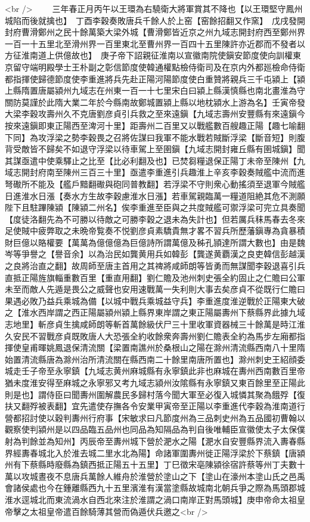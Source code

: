 <br />
　　三年春正月丙午以王環為右驍衛大將軍賞其不降也【以王環堅守鳳州城陷而後就擒也】　丁酉李穀奏敗唐兵千餘人於上窑【窑餘招翻又作窯】　戊戌發開封府曹滑鄭州之民十餘萬築大梁外城【曹滑鄭皆近京之州九域志開封府西至鄭州界一百一十五里北至滑州界一百里東北至曹州界一百四十五里陳許亦近郡而不發者以方征淮南道上供億故也】　庚子帝下詔親征淮南以宣徽南院使鎭安節度使向訓權東京留守端明殿學士王朴副之彰信節度使韓通權點檢侍衛司及在京内外都廵檢命侍衛都指揮使歸德節度使李重進將兵先赴正陽河陽節度使白重贊將親兵三千屯潁上【潁上縣隋置唐屬潁州九域志在州東一百一十七里宋白曰潁上縣漢慎縣也南北畫淮為守關防莫謹於此隋大業二年於今縣南故鄭城置潁上縣以地枕潁水上游為名】壬寅帝發大梁李穀攻壽州久不克唐劉彦貞引兵救之至來遠鎭【九域志壽州安豐縣有來遠鎭今按來遠鎭即東正陽西至渒河十里】距壽州二百里又以戰艦數百艘趣正陽【趣七喻翻下同】為攻浮梁之勢李穀畏之召將佐謀曰我軍不能水戰若賊斷浮梁【斷音短】則腹背受敵皆不歸矣不如退守浮梁以待車駕上至圉鎭【九域志開封雍丘縣有圉城鎭】聞其謀亟遣中使乘驛止之比至【比必利翻及也】已焚芻糧退保正陽丁未帝至陳州【九域志開封府南至陳州三百三十里】亟遣李重進引兵趣淮上辛亥李穀奏賊艦中流而進弩礮所不能及【艦戶黯翻礮與砲同普教翻】若浮梁不守則衆心動搖須至退軍今賊艦日進淮水日漲【奏水方生故李穀慮淮水日漲】若車駕親臨萬一糧道阻絶其危不測願陛下且駐蹕陳潁【陳潁二州名】俟李重進至臣與之共度賊艦可禦浮梁可完立具奏聞【度徒洛翻先為不可勝以待敵之可勝李穀之退未為失計也】但若厲兵秣馬春去冬來足使賊中疲弊取之未晩帝覧奏不悦劉彦貞素驕貴無才畧不習兵所歷藩鎭專為貪暴積財巨億以賂權要【萬萬為億億億為巨億詩所謂萬億及秭孔頴達所謂大數也】由是魏岑等爭譽之【譽音余】以為治民如龔黄用兵如韓彭【龔遂黄覇漢之良吏韓信彭越漢之良將治直之翻】故周師至唐主首用之其禆將咸師朗等皆勇而無謀聞李穀退喜引兵直抵正陽旌旗輜重數百里【重直用翻】劉仁贍及池州刺史張全約固止之仁贍曰公軍未至而敵人先遁是畏公之威聲也安用速戰萬一失利則大事去矣彦貞不從既行仁贍曰果遇必敗乃益兵乘城為備【以城中戰兵乘城益守兵】李重進度淮逆戰於正陽東大破之【淮水西岸謂之西正陽屬潁州潁上縣界東岸謂之東正陽屬夀州下蔡縣界此據九域志地里】斬彦貞生擒咸師朗等斬首萬餘級伏尸三十里收軍資器械三十餘萬是時江淮久安民不習戰彦貞既敗唐人大恐張全約收餘衆奔壽州劉仁贍表全約為馬步左廂都指揮使皇甫暉姚鳳退保清流關【梁置南譙州於桑根山之陽在滁州清流縣西南八十里隋始置清流縣唐為滁州治所清流關在縣西南二十餘里南唐所置也】滁州刺史王紹顔委城走壬子帝至永寧鎮【九域志黄州麻城縣有永寧鎮此非也麻城在夀州西南數百里帝猶未度淮安得至麻城之永寧邪又考九域志潁州汝隂縣有永寧鎮又東百餘里至正陽此則是也】謂侍臣曰聞夀州圍解農民多歸村落今聞大軍至必復入城憐其聚為餓殍【復扶又翻殍被表翻】宜先遣使存撫各令安業甲寅帝至正陽以李重進代李穀為淮南道行營都招討使以穀判夀州行府事【宋敏求曰凡節度州為三品刺史州為五品國初曹翰以觀察使判潁州是以四品臨五品州也同品為知隔品為判自後唯輔臣宣徽使太子太保僕射為判餘並為知州】丙辰帝至夀州城下營於淝水之陽【淝水自安豐縣界流入夀春縣界經夀春城北入於淮去城二里水北為陽】命諸軍圍夀州徙正陽浮梁於下蔡鎮【唐潁州有下蔡縣時廢縣為鎮西抵正陽五十五里】丁巳徵宋亳陳潁徐宿許蔡等州丁夫數十萬以攻城晝夜不息唐兵萬餘人維舟於淮營於塗山之下【塗山在濠州本塗山氏之邑禹會諸侯處也今在鍾離縣西九十五里濱淮有漢當塗縣故城南北朝兵爭之際為馬頭郡城淮水逕城北而東流渦水自西北來注於淮謂之渦口南岸正對馬頭城】庚申帝命太祖皇帝擊之太祖皇帝遣百餘騎薄其營而偽遁伏兵邀之<br />
